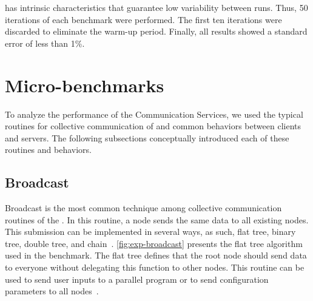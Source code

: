	\mppa has intrinsic characteristics that guarantee low variability between runs.
	Thus, 50 iterations of each benchmark were performed. The first ten iterations
	were discarded to eliminate the warm-up period. Finally, all results showed a
	standard error of less than 1\%.

	\section{Micro-benchmarks}

		To analyze the performance of the Communication Services, we used the typical
		routines for collective communication of \mpi and common behaviors between
		clients and servers. The following subsections conceptually introduced each
		of these routines and behaviors.

		\subsection{Broadcast}

			Broadcast is the most common technique among collective communication
			routines of the \mpi. In this routine, a node sends the same data to
			all existing nodes. This submission can be implemented in several ways,
			as such, flat tree, binary tree, double tree, and chain~\cite{survey-mpi}.
			\autoref{fig:exp-broadcast} presents the flat tree algorithm used in
			the benchmark. The flat tree defines that the root node should send
			data to everyone without delegating this function to other nodes.
			This routine can be used to send user inputs to a parallel program
			or to send configuration parameters to all nodes~\cite{url:mpitutorial}.

